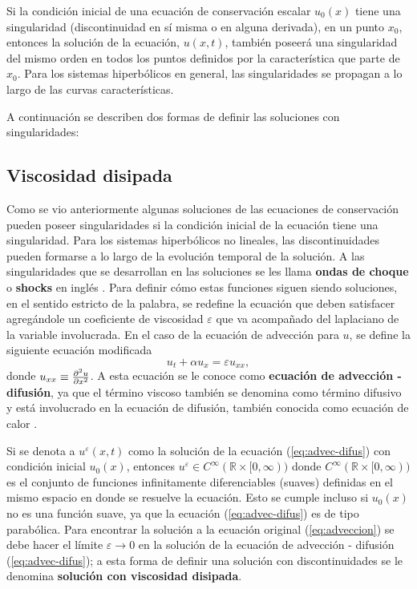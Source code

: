 Si la condición inicial de una ecuación de conservación escalar $u_0(x)$ tiene una singularidad (discontinuidad en sí misma o en alguna derivada), en un punto $x_0$, entonces la solución de la ecuación, $u(x,t)$, también poseerá una singularidad del mismo orden en todos los puntos definidos por la característica que parte de $x_0$. Para los sistemas hiperbólicos en general, las singularidades se propagan a lo largo de las curvas características.

A continuación se describen dos formas de definir las soluciones con singularidades:
\subsection{Viscosidad disipada}
Como se vio anteriormente algunas soluciones de las ecuaciones de conservación pueden poseer singularidades si la condición inicial de la ecuación tiene una singularidad. Para los sistemas hiperbólicos no lineales, las discontinuidades pueden formarse a lo largo de la evolución temporal de la solución. A las singularidades que se desarrollan en las soluciones se les llama \textbf{ondas de choque} o \textbf{shocks} en inglés \cite{Cameron}. Para definir cómo estas funciones siguen siendo soluciones, en el sentido estricto de la palabra, se redefine la ecuación que deben satisfacer agregándole un coeficiente de viscosidad $\varepsilon$ que va acompañado del laplaciano de la variable involucrada. En el caso de la ecuación de advección para $u$, se define la siguiente ecuación modificada
\begin{equation}
	u_t + \alpha u_x = \varepsilon u_{xx},
	\label{eq:advec-difus}
\end{equation}
donde $u_{xx} \equiv \pdv[2]{u}{x}$. A esta ecuación se le conoce como \textbf{ecuación de advección - difusión}, ya que el término viscoso también se denomina como término difusivo y está involucrado en la ecuación de difusión, también conocida como ecuación de calor \cite{heattransfer}. 

Si se denota a $u^{\varepsilon}(x,t)$ como la solución de la ecuación (\ref{eq:advec-difus}) con condición inicial $u_0(x)$, entonces $u^{\varepsilon} \in C^{\infty}(\mathbb{R} \times [0,\infty)) $ donde $ C^{\infty}(\mathbb{R}\times [0,\infty))$ es el conjunto de funciones infinitamente diferenciables (suaves) definidas en el mismo espacio en donde se resuelve la ecuación. Esto se cumple incluso si $u_0(x)$ no es una función suave, ya que la ecuación (\ref{eq:advec-difus}) es de tipo parabólica. Para encontrar la solución a la ecuación original (\ref{eq:adveccion}) se debe hacer el límite $\varepsilon \rightarrow 0$ en la solución de la ecuación de advección - difusión (\ref{eq:advec-difus}); a esta forma de definir una solución con discontinuidades se le denomina \textbf{solución con viscosidad disipada}.

